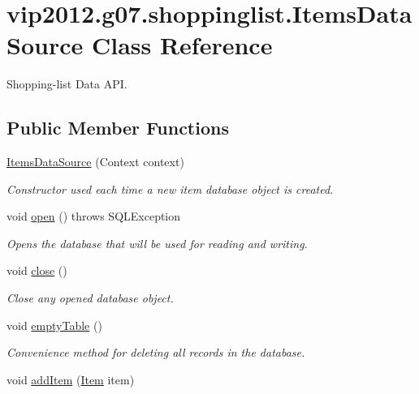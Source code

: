\hypertarget{classvip2012_1_1g07_1_1shoppinglist_1_1ItemsDataSource}{\section{vip2012.\-g07.\-shoppinglist.\-Items\-Data\-Source Class Reference}
\label{d5/d8c/classvip2012_1_1g07_1_1shoppinglist_1_1ItemsDataSource}
}


Shopping-\/list Data A\-P\-I.  


\subsection*{Public Member Functions}
\begin{DoxyCompactItemize}
\item 
\hyperlink{classvip2012_1_1g07_1_1shoppinglist_1_1ItemsDataSource_a7f587b5659f28abccaa29599d1929b0e}{Items\-Data\-Source} (Context context)
\begin{DoxyCompactList}\small\item\em Constructor used each time a new item database object is created. \end{DoxyCompactList}\item 
void \hyperlink{classvip2012_1_1g07_1_1shoppinglist_1_1ItemsDataSource_a112f0fe334be82e8ea9c007bbda43a9b}{open} ()  throws S\-Q\-L\-Exception 
\begin{DoxyCompactList}\small\item\em Opens the database that will be used for reading and writing. \end{DoxyCompactList}\item 
void \hyperlink{classvip2012_1_1g07_1_1shoppinglist_1_1ItemsDataSource_a1ce40231e9a340d63593060a7669054d}{close} ()
\begin{DoxyCompactList}\small\item\em Close any opened database object. \end{DoxyCompactList}\item 
void \hyperlink{classvip2012_1_1g07_1_1shoppinglist_1_1ItemsDataSource_a46a373cfb826d1276d1466b4179ad87e}{empty\-Table} ()
\begin{DoxyCompactList}\small\item\em Convenience method for deleting all records in the database. \end{DoxyCompactList}\item 
void \hyperlink{classvip2012_1_1g07_1_1shoppinglist_1_1ItemsDataSource_a6e314e4ad98c8084515bd1f8835100d6}{add\-Item} (\hyperlink{classvip2012_1_1g07_1_1shoppinglist_1_1Item}{Item} item)

\end{DoxyCompactItemize}
